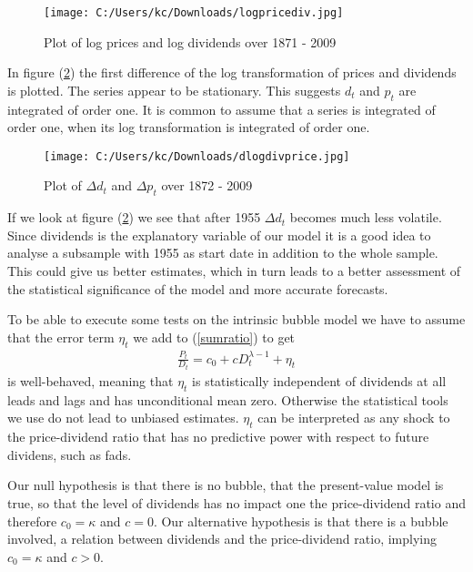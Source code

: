 \documentclass{article}
\begin{document}
\begin{figure}[t!]
	\centering	\texttt{[image: C:/Users/kc/Downloads/logpricediv.jpg]}
	\caption{Plot of log prices and log dividends over 1871 - 2009}
	\label{logpricediv}
\end{figure}

In figure (\ref{dlnpricediv}) the first difference of the log transformation of prices and dividends is plotted. The series appear to be stationary. This suggests $d_t$ and $p_t$ are integrated of order one. It is common to assume that a series is integrated of order one, when its log transformation  is integrated of order one. 

\begin{figure}[h!]
	\centering
		\texttt{[image: C:/Users/kc/Downloads/dlogdivprice.jpg]}
	\caption{Plot of $\Delta d_t$ and $\Delta p_t$ over 1872 - 2009}
	\label{dlnpricediv}
\end{figure}

If we look at figure (\ref{dlnpricediv}) we see that after 1955 $\Delta d_t$ becomes much less volatile. Since dividends is the explanatory variable of our model it is a good idea to analyse a subsample with 1955 as start date in addition to the whole sample.	 This could give us better estimates, which in turn leads to a better assessment of the statistical significance of the model and more accurate forecasts.  
\newpage
	
To be able to execute some tests on the intrinsic bubble model we have to assume that the error  term $\eta_t$ we add to (\ref{sumratio}) to get
\begin{eqnarray}
\frac{P_t}{D_t} =  c_0  + c D_t^{\lambda - 1} + \eta_t \label{intrinsicmodel}
\end{eqnarray}
is well-behaved, meaning that $\eta_t$ is statistically independent of dividends at all leads and lags and has unconditional mean zero\footnotemark. Otherwise the statistical tools we use do not lead to unbiased estimates. $\eta_t$ can be interpreted as any shock to the price-dividend ratio that has no predictive power with respect to future dividens, such as fads. 

Our null hypothesis is that there is no bubble, that the present-value model is true, so that the level of dividends has no impact one the price-dividend ratio  and therefore $c_0 = \kappa$ and $c=0$. Our alternative hypothesis is that there is a bubble involved, a relation between dividends and the price-dividend ratio, implying $c_0 = \kappa$ and $c > 0$. 
\end{document}
